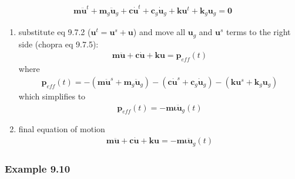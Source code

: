 \documentclass[letterpaper,10pt,english]{sphinxmanual}
\let\sphinxpxdimen\pdfpxdimen\else\newdimen\sphinxpxdimen
\begin{document}
\begin{equation*}
\begin{split}\mathbf{m}\mathbf{\ddot{u}}^t + \mathbf{m}_g\mathbf{\ddot{u}}_g
+
\mathbf{c}\mathbf{\dot{u}}^t + \mathbf{c}_g\mathbf{\dot{u}}_g
+
\mathbf{k}\mathbf{u}^t + \mathbf{k}_g\mathbf{u}_g
=
\mathbf{0}\end{split}
\end{equation*}\begin{enumerate}
%
\setcounter{enumi}{2}
\item {} 
\sphinxAtStartPar
substitute eq 9.7.2 (\(\mathbf{u}^t=\mathbf{u}^s+\mathbf{u}\)) and move all \(\mathbf{u}_g\) and \(\mathbf{u}^s\) terms to the right side (chopra eq 9.7.5):
\begin{equation*}
\begin{split}\mathbf{m}\mathbf{\ddot{u}} + \mathbf{c}\mathbf{\dot{u}} + \mathbf{k}\mathbf{u}
= \mathbf{p}_{eff}(t)\end{split}
\end{equation*}
\sphinxAtStartPar
where
\begin{equation*}
\begin{split}\mathbf{p}_{eff}(t) =
-(\mathbf{m}\mathbf{\ddot{u}}^s+\mathbf{m}_g\mathbf{\ddot{u}}_g)
-(\mathbf{c}\mathbf{\dot{u}}^s+\mathbf{c}_g\mathbf{\dot{u}}_g)
-(\mathbf{k}\mathbf{u}^s+\mathbf{k}_g\mathbf{u}_g)\end{split}
\end{equation*}
\sphinxAtStartPar
which simplifies to
\begin{equation*}
\begin{split}\mathbf{p}_{eff}(t) =
-\mathbf{m}\mathbf{\iota}\mathbf{\ddot{u}}_g(t)\end{split}
\end{equation*}
\item {} 
\sphinxAtStartPar
final equation of motion
\begin{equation*}
\begin{split}\mathbf{m}\mathbf{\ddot{u}} + \mathbf{c}\mathbf{\dot{u}} + \mathbf{k}\mathbf{u}
= -\mathbf{m}\mathbf{\iota}\mathbf{\ddot{u}}_g(t)\end{split}
\end{equation*}
\end{enumerate}


\subsubsection{Example 9.10}
\label{\detokenize{examples/05_MIMO_Event:Example-9.10}}
\noindent\sphinxincludegraphics[width=1058\sphinxpxdimen,height=1240\sphinxpxdimen]{{ex9.10}.png}
\end{document}
